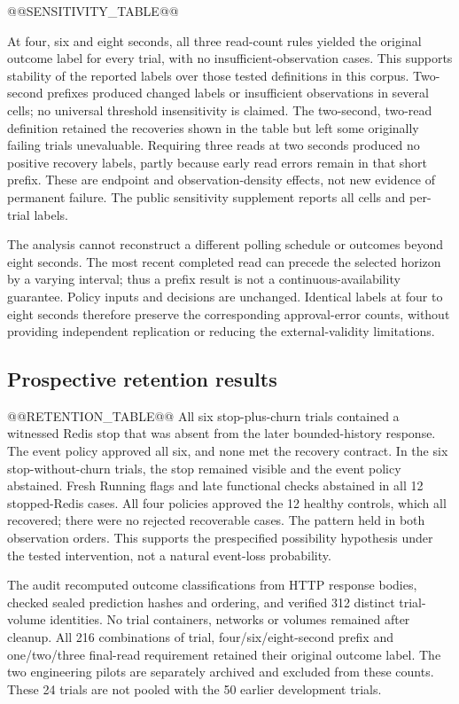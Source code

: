 \documentclass[manuscript,review,nonacm]{acmart}
\begin{document}
@@SENSITIVITY_TABLE@@

At four, six and eight seconds, all three read-count rules yielded the original outcome label for every trial, with no insufficient-observation cases. This supports stability of the reported labels over those tested definitions in this corpus. Two-second prefixes produced changed labels or insufficient observations in several cells; no universal threshold insensitivity is claimed. The two-second, two-read definition retained the recoveries shown in the table but left some originally failing trials unevaluable. Requiring three reads at two seconds produced no positive recovery labels, partly because early read errors remain in that short prefix. These are endpoint and observation-density effects, not new evidence of permanent failure. The public sensitivity supplement reports all cells and per-trial labels.

The analysis cannot reconstruct a different polling schedule or outcomes beyond eight seconds. The most recent completed read can precede the selected horizon by a varying interval; thus a prefix result is not a continuous-availability guarantee. Policy inputs and decisions are unchanged. Identical labels at four to eight seconds therefore preserve the corresponding approval-error counts, without providing independent replication or reducing the external-validity limitations.

\subsection{Prospective retention results}
@@RETENTION_TABLE@@
All six stop-plus-churn trials contained a witnessed Redis stop that was absent from the later bounded-history response. The event policy approved all six, and none met the recovery contract. In the six stop-without-churn trials, the stop remained visible and the event policy abstained. Fresh Running flags and late functional checks abstained in all 12 stopped-Redis cases. All four policies approved the 12 healthy controls, which all recovered; there were no rejected recoverable cases. The pattern held in both observation orders. This supports the prespecified possibility hypothesis under the tested intervention, not a natural event-loss probability.

The audit recomputed outcome classifications from HTTP response bodies, checked sealed prediction hashes and ordering, and verified 312 distinct trial-volume identities. No trial containers, networks or volumes remained after cleanup. All 216 combinations of trial, four/six/eight-second prefix and one/two/three final-read requirement retained their original outcome label. The two engineering pilots are separately archived and excluded from these counts. These 24 trials are not pooled with the 50 earlier development trials.
\end{document}
